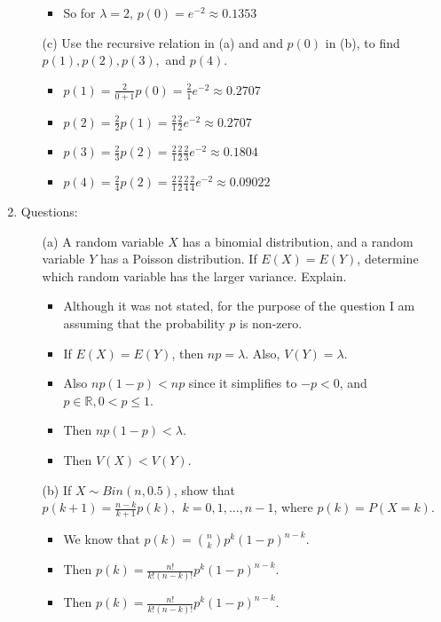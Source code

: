 \documentclass{article}
\begin{document}
\begin{enumerate}
\begin{itemize}
\begin{itemize}
        \item So for $\lambda=2$, $p(0) = e^{-2} \approx 0.1353$
        \end{itemize}
    \item [(c)] Use the recursive relation in (a) and and $p(0)$ in (b), to find $p(1),p(2),p(3),$ and $p(4)$.
        \begin{itemize}
        \item $p(1) = \frac{2}{0+1}p(0) = \frac{2}{1} e^{-2} \approx 0.2707$
        \item $p(2) = \frac{2}{2}p(1) = \frac{2}{1} \frac{2}{2} e^{-2} \approx 0.2707$
        \item $p(3) = \frac{2}{3}p(2) = \frac{2}{1} \frac{2}{2} \frac{2}{3} e^{-2} \approx 0.1804$
        \item $p(4) = \frac{2}{4}p(2) = \frac{2}{1} \frac{2}{2} \frac{2}{4} \frac{2}{4} e^{-2} \approx 0.09022$
        \end{itemize}
    \end{itemize}
\item Questions:
    \begin{itemize}
    \item [(a)] A random variable $X$ has a binomial distribution, and a random variable $Y$ has a Poisson distribution. If $E(X)=E(Y)$, determine which random variable has the larger variance. Explain.
        \begin{itemize}
        \item Although it was not stated, for the purpose of the question I am assuming that the probability $p$ is non-zero.
        \item If $E(X) = E(Y)$, then $np = \lambda$. Also, $V(Y) = \lambda$.
        \item Also $np(1 - p) < np$ since it simplifies to $-p < 0$, and $p \in \mathbb{R}, 0 < p \leq 1$.
        \item Then $np(1 - p) < \lambda$.
        \item Then $V(X) < V(Y)$.
        \end{itemize}
    \item [(b)] If $X\sim Bin(n,0.5)$, show that $p(k+1)=\frac{n-k}{k+1}p(k),\ \ k=0,1,\ldots, n-1$, where $p(k)=P(X=k)$.
        \begin{itemize}
        \item We know that $p(k) = \binom{n}{k} p^k (1 - p)^{n-k}$.
        \item Then $p(k) = \frac{n!}{k!(n-k)!} p^k (1 - p)^{n-k}$.
        \item Then $p(k) = \frac{n!}{k!(n-k)!} p^k (1 - p)^{n-k}$.

\end{itemize}
\end{itemize}
\end{enumerate}
\end{document}
